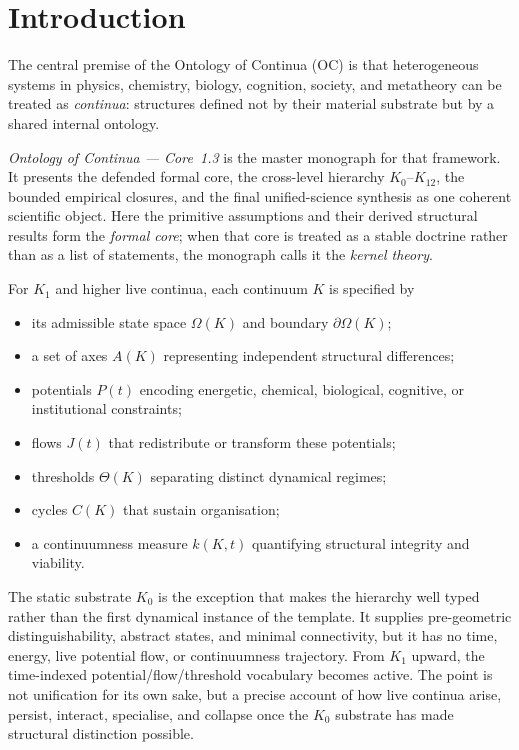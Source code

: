 
\section{Introduction}
\label{sec:intro}

The central premise of the Ontology of Continua (OC) is that heterogeneous
systems in physics, chemistry, biology, cognition, society, and metatheory can
be treated as \emph{continua}: structures defined
not by their material substrate but by a shared internal ontology.

\emph{Ontology of Continua --- Core~1.3} is the master monograph for that
framework. It presents the defended formal core, the cross-level hierarchy
\(K_0\)–\(K_{12}\), the bounded empirical closures, and the final
unified-science synthesis as one coherent scientific object.
Here the primitive assumptions and their derived structural results form the
\emph{formal core}; when that core is treated as a stable doctrine rather than
as a list of statements, the monograph calls it the \emph{kernel theory}.

For \(K_1\) and higher live continua, each continuum \(K\) is specified by

\begin{itemize}
    \item its admissible state space \(\Omega(K)\) and boundary \(\partial\Omega(K)\);
    \item a set of axes \(A(K)\) representing independent structural differences;
    \item potentials \(P(t)\) encoding energetic, chemical, biological, cognitive, or institutional constraints;
    \item flows \(J(t)\) that redistribute or transform these potentials;
    \item thresholds \(\Theta(K)\) separating distinct dynamical regimes;
    \item cycles \(C(K)\) that sustain organisation;
    \item a continuumness measure \(k(K,t)\) quantifying structural integrity and viability.
\end{itemize}

The static substrate \(K_0\) is the exception that makes the hierarchy well
typed rather than the first dynamical instance of the template. It supplies
pre-geometric distinguishability, abstract states, and minimal connectivity,
but it has no time, energy, live potential flow, or continuumness trajectory.
From \(K_1\) upward, the time-indexed potential/flow/threshold vocabulary
becomes active. The point is not unification for its own sake, but a precise
account of how live continua arise, persist, interact, specialise, and
collapse once the \(K_0\) substrate has made structural distinction possible.

